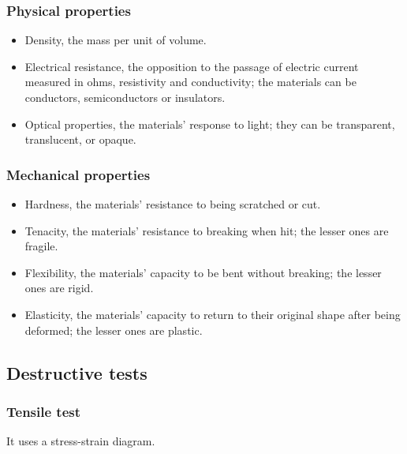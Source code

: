 \documentclass{article}
\begin{document}
\subsubsection*{Physical properties}

\begin{itemize}
    \item Density, the mass per unit of volume.
    \item Electrical resistance, the opposition to the passage of electric
    current measured in ohms, resistivity and conductivity; the materials can be
    conductors, semiconductors or insulators.
    \item Optical properties, the materials' response to light; they can be
    transparent, translucent, or opaque.
\end{itemize}

\subsubsection*{Mechanical properties}

\begin{itemize}
    \item Hardness, the materials' resistance to being scratched or cut.
    \item Tenacity, the materials' resistance to breaking when hit; the lesser
    ones are fragile.
    \item Flexibility, the materials' capacity to be bent without breaking; the
    lesser ones are rigid.
    \item Elasticity, the materials' capacity to return to their original shape
    after being deformed; the lesser ones are plastic.
\end{itemize}

\subsection*{Destructive tests}

\subsubsection*{Tensile test}

It uses a stress-strain diagram.
\end{document}
